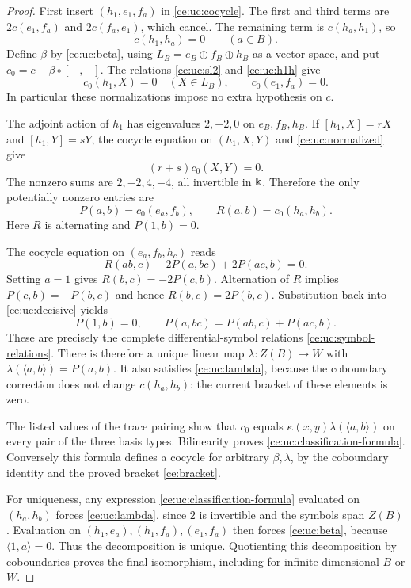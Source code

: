 \begin{proof}
First insert $(h_1,e_1,f_a)$ in \eqref{ce:uc:cocycle}.  The first and third
terms are $2c(e_1,f_a)$ and $2c(f_a,e_1)$, which cancel.  The remaining
term is $c(h_a,h_1)$, so
\begin{equation}\label{ce:uc:h1h}
 c(h_1,h_a)=0\qquad(a\in B).
\end{equation}
Define $\beta$ by \eqref{ce:uc:beta}, using
$L_B=e_B\oplus f_B\oplus h_B$ as a vector space, and put
$c_0=c-\beta\circ[-,-]$.  The relations \eqref{ce:uc:sl2} and
\eqref{ce:uc:h1h} give
\begin{equation}\label{ce:uc:normalized}
 c_0(h_1,X)=0\quad(X\in L_B),\qquad c_0(e_1,f_a)=0.
\end{equation}
In particular these normalizations impose no extra hypothesis on $c$.

The adjoint action of $h_1$ has eigenvalues $2,-2,0$ on $e_B,f_B,h_B$.
If $[h_1,X]=rX$ and $[h_1,Y]=sY$, the cocycle equation on $(h_1,X,Y)$
and \eqref{ce:uc:normalized} give
\[
 (r+s)c_0(X,Y)=0.
\]
The nonzero sums are $2,-2,4,-4$, all invertible in $\Bbbk$.
Therefore the only potentially nonzero entries are
\[
 P(a,b)=c_0(e_a,f_b),\qquad R(a,b)=c_0(h_a,h_b).
\]
Here $R$ is alternating and $P(1,b)=0$.

The cocycle equation on $(e_a,f_b,h_c)$ reads
\begin{equation}\label{ce:uc:decisive}
 R(ab,c)-2P(a,bc)+2P(ac,b)=0.
\end{equation}
Setting $a=1$ gives $R(b,c)=-2P(c,b)$.  Alternation of $R$ implies
$P(c,b)=-P(b,c)$ and hence $R(b,c)=2P(b,c)$.
Substitution back into \eqref{ce:uc:decisive} yields
\begin{equation}\label{ce:uc:P-relations}
 P(1,b)=0,\qquad P(a,bc)=P(ab,c)+P(ac,b).
\end{equation}
These are precisely the complete differential-symbol relations
\eqref{ce:uc:symbol-relations}.  There is therefore a unique linear map
$\lambda:Z(B)\to W$ with $\lambda(\langle a,b\rangle)=P(a,b)$.
It also satisfies \eqref{ce:uc:lambda}, because the coboundary correction
does not change $c(h_a,h_b)$: the current bracket of these elements is
zero.

The listed values of the trace pairing show that $c_0$ equals
$\kappa(x,y)\lambda(\langle a,b\rangle)$ on every pair of the three
basis types.  Bilinearity proves \eqref{ce:uc:classification-formula}.
Conversely this formula defines a cocycle for arbitrary $\beta,\lambda$,
by the coboundary identity and the proved bracket
\eqref{ce:bracket}.

For uniqueness, any expression \eqref{ce:uc:classification-formula}
evaluated on $(h_a,h_b)$ forces \eqref{ce:uc:lambda}, since $2$ is
invertible and the symbols span $Z(B)$.  Evaluation on
$(h_1,e_a),(h_1,f_a),(e_1,f_a)$ then forces \eqref{ce:uc:beta}, because
$\langle1,a\rangle=0$.  Thus the decomposition is unique.
Quotienting this decomposition by coboundaries proves the final
isomorphism, including for infinite-dimensional $B$ or $W$.
\end{proof}

